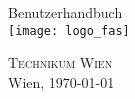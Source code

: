 %
%

\begin{titlepage}
\begin{center}
\vspace*{40mm} \huge Benutzerhandbuch\\
\vspace*{10mm}
\vfill \texttt{[image: logo\_fas]}
	
\large \vfill \textsc{Technikum Wien}\\

Wien, \today
\end{center}
\end{titlepage}

